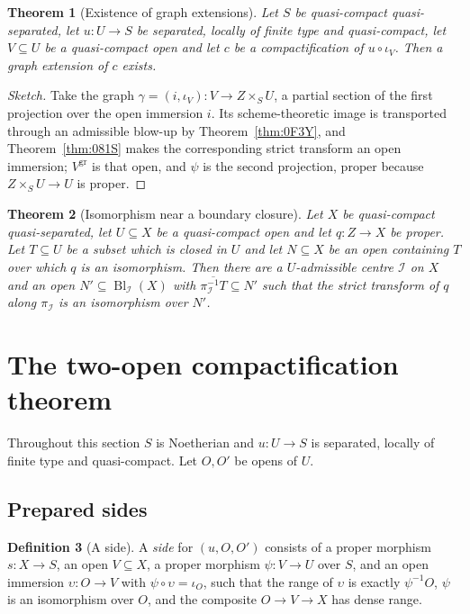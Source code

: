 \documentclass[11pt,a4paper]{article}
\theoremstyle{plain}
\newtheorem{theorem}{Theorem}[section]
\theoremstyle{definition}
\newtheorem{definition}[theorem]{Definition}
\theoremstyle{remark}
\newcommand{\Bl}{\operatorname{Bl}}
\newcommand{\sI}{\mathcal{I}}
\newcommand{\qcqs}{quasi-compact quasi-separated}
\begin{document}
\begin{theorem}[Existence of graph extensions]
\label{thm:0F3Z}
Let $S$ be \qcqs{}, let $u\colon U\to S$ be separated, locally of finite type
and quasi-compact, let $V\subseteq U$ be a quasi-compact open and let $c$ be a
compactification of $u\circ\iota_V$. Then a graph extension of $c$ exists.
\end{theorem}

\begin{proof}[Sketch]
Take the graph $\gamma=(i,\iota_V)\colon V\to Z\times_S U$, a partial section of
the first projection over the open immersion $i$. Its scheme-theoretic image is
transported through an admissible blow-up by Theorem~\ref{thm:0F3Y}, and
Theorem~\ref{thm:081S} makes the corresponding strict transform an open
immersion; $V^{\mathrm{gr}}$ is that open, and $\psi$ is the second projection,
proper because $Z\times_S U\to U$ is proper.
\end{proof}

\begin{theorem}[Isomorphism near a boundary closure]
\label{thm:0F3W}
Let $X$ be \qcqs{}, let $U\subseteq X$ be a quasi-compact open and let
$q\colon Z\to X$ be proper. Let $T\subseteq U$ be a subset which is closed in
$U$ and let $N\subseteq X$ be an open containing $T$ over which $q$ is an
isomorphism. Then there are a $U$-admissible centre $\sI$ on $X$ and an open
$N'\subseteq\Bl_\sI(X)$ with $\overline{\pi_\sI^{-1}T}\subseteq N'$ such that
the strict transform of $q$ along $\pi_\sI$ is an isomorphism over $N'$.
\end{theorem}

\section{The two-open compactification theorem}
\label{sec:two-open}

Throughout this section $S$ is Noetherian and $u\colon U\to S$ is separated,
locally of finite type and quasi-compact. Let $O,O'$ be opens of $U$.

\subsection{Prepared sides}

\begin{definition}[A side]
\label{def:two-open-side}
A \emph{side} for $(u,O,O')$ consists of a proper morphism $s\colon X\to S$, an
open $V\subseteq X$, a proper morphism $\psi\colon V\to U$ over $S$, and an
open immersion $\upsilon\colon O\to V$ with $\psi\circ\upsilon=\iota_O$, such
that the range of $\upsilon$ is exactly $\psi^{-1}O$, $\psi$ is an isomorphism
over $O$, and the composite $O\to V\to X$ has dense range.
\end{definition}
\end{document}
